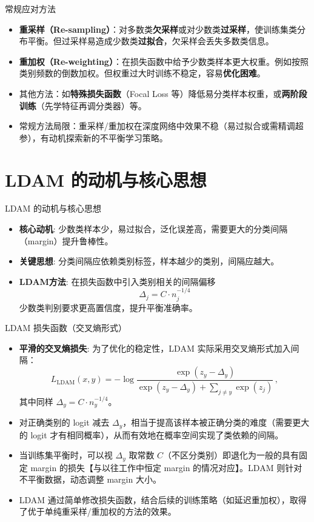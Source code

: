 \documentclass{beamer}
\begin{document}
\begin{frame}{常规应对方法}
    \begin{itemize}
        \item \textbf{重采样（Re-sampling）}：对多数类\textbf{欠采样}或对少数类\textbf{过采样}，使训练集类分布平衡。但过采样易造成少数类\textbf{过拟合}，欠采样会丢失多数类信息。
        \item \textbf{重加权（Re-weighting）}：在损失函数中给予少数类样本更大权重。例如按照类别频数的倒数加权。但权重过大时训练不稳定，容易\textbf{优化困难}。
        \item 其他方法：如\textbf{特殊损失函数}（Focal Loss 等）降低易分类样本权重，或\textbf{两阶段训练}（先学特征再调分类器）等。
        \item 常规方法局限：重采样/重加权在深度网络中效果不稳（易过拟合或需精调超参），有动机探索新的不平衡学习策略。
    \end{itemize}
\end{frame}

\section{LDAM 的动机与核心思想}
\begin{frame}{LDAM 的动机与核心思想}
    \begin{itemize}
        \item \textbf{核心动机}: 少数类样本少，易过拟合，泛化误差高，需要更大的分类间隔（margin）提升鲁棒性。
        \item \textbf{关键思想}: 分类间隔应依赖类别标签，样本越少的类别，间隔应越大。
        \item \textbf{LDAM方法}: 在损失函数中引入类别相关的间隔偏移
        \[
            \Delta_j = C \cdot n_j^{-1/4}
        \]
        少数类判别要求更高置信度，提升平衡准确率。
    \end{itemize}
\end{frame}

\begin{frame}{LDAM 损失函数（交叉熵形式）}
    \begin{itemize}
        \item \textbf{平滑的交叉熵损失}: 为了优化的稳定性，LDAM 实际采用交叉熵形式加入间隔：
        \[
            L_{\text{LDAM}}(x,y) = -\log \frac{\exp(z_y - \Delta_y)}{\exp(z_y - \Delta_y) + \sum_{j \neq y}\exp(z_j)}\,,
        \] 
        其中同样 $\Delta_y = C \cdot n_y^{-1/4}$。
        \item 对正确类别的 logit 减去 $\Delta_y$，相当于提高该样本被正确分类的难度（需要更大的 logit 才有相同概率），从而有效地在概率空间实现了类依赖的间隔。
        \item 当训练集平衡时，可以视 $\Delta_y$ 取常数 $C$（不区分类别）即退化为一般的具有固定 margin 的损失【与以往工作中恒定 margin 的情况对应】。LDAM 则针对不平衡数据，动态调整 margin 大小。
        \item LDAM 通过简单修改损失函数，结合后续的训练策略（如延迟重加权），取得了优于单纯重采样/重加权的方法的效果。
    \end{itemize}
\end{frame}
\end{document}
